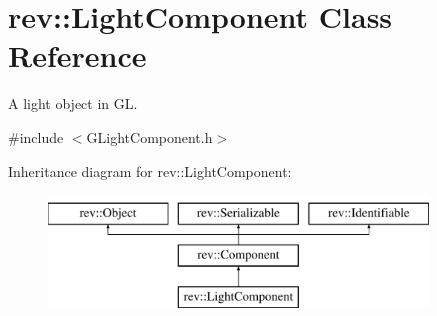 \hypertarget{classrev_1_1_light_component}{}\section{rev\+::Light\+Component Class Reference}
\label{classrev_1_1_light_component}


A light object in GL.  




{\ttfamily \#include $<$G\+Light\+Component.\+h$>$}

Inheritance diagram for rev\+::Light\+Component\+:\begin{figure}[H]
\begin{center}
\leavevmode
\includegraphics[height=3.000000cm]{classrev_1_1_light_component}
\end{center}
\end{figure}
